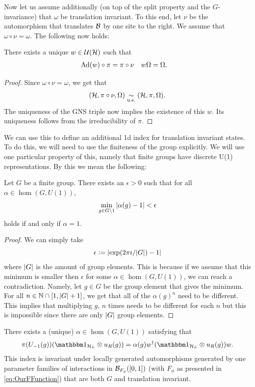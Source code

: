 \documentclass[12pt,a4paper,twoside]{article}
\numberwithin{equation}{section}
\begin{document}
Now let us assume additionally (on top of the split property and the $G$-invariance) that $\omega$ be translation invariant. To this end, let $\nu$ be the automorphism that translates $\mathcal B$ by one site to the right. We assume that $\omega\circ\nu=\omega$. The following now holds:
\begin{lemma}
	There exists a unique $w\in\mathcal U(\mathcal H)$ such that
	\begin{align}
		\Ad{w}\circ\pi&=\pi\circ\nu&w\Omega&=\Omega.
	\end{align}
\end{lemma}
\begin{proof}
	Since $\omega\circ\nu=\omega$, we get that
	\begin{equation}
		(\mathcal H,\pi\circ\nu,\Omega)\underset{\text{u.e.}}{\sim} (\mathcal H,\pi,\Omega).
	\end{equation}
	The uniqueness of the GNS triple now implies the existence of this $w$. Its uniqueness follows from the irreducibility of $\pi$.
\end{proof}
We can use this to define an additional 1d index for translation invariant states. To do this, we will need to use the finiteness of the group explicitly. We will use one particular property of this, namely that finite groups have discrete U(1) representations. By this we mean the following:
\begin{lemma}\label{lem:FiniteGroupsHaveDiscreteU(1)Representations}
	Let $G$ be a finite group. There exists an $\epsilon>0$ such that for all $\alpha\in\hom(G,U(1))$,
	\begin{equation}
		\min_{g\in G\setminus 1}\abs{\alpha(g)-1}<\epsilon
	\end{equation}
	holds if and only if $\alpha=1$.
\end{lemma}
\begin{proof}
	We can simply take
	\begin{equation}
		\epsilon\vcentcolon= \abs{\exp(2\pi i/\abs{G})-1}
	\end{equation}
	where $\abs{G}$ is the amount of group elements. This is because if we assume that this minimum is smaller then $\epsilon$ for some $\alpha\in\hom(G,U(1))$, we can reach a contradiction. Namely, let $g\in G$ be the group element that gives the minimum. For all $n\in\mathbb{N}\cap [1,\abs{G}+1]$, we get that all of the $\alpha(g)^n$ need to be different. This implies that multiplying $g$, $n$ times needs to be different for each $n$ but this is impossible since there are only $\abs{G}$ group elements.
\end{proof}
\begin{lemma}
	There exists a (unique) $\alpha\in\hom(G,U(1))$ satisfying that
	\begin{equation}
		\pi(U_{-1}(g)) (\id_{\HH_L}\otimes u_R(g))=\alpha(g)w^\dagger(\id_{\HH_L}\otimes u_R(g)) w.
	\end{equation}
	This index is invariant under locally generated automorphisms generated by one parameter families of interactions in $\mathcal B_{F_\phi}([0,1])$ (with $F_\phi$ as presented in \eqref{eq:OurFFunction}) that are both $G$ and translation invariant.
\end{lemma}
\end{document}
